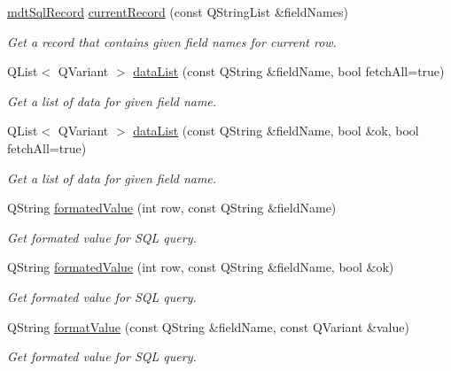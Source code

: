 \begin{DoxyCompactItemize}
\hyperlink{classmdt_sql_record}{mdt\-Sql\-Record} \hyperlink{classmdt_abstract_sql_table_controller_a0f397fe1d28fe99360a31479c023629f}{current\-Record} (const Q\-String\-List \&field\-Names)
\begin{DoxyCompactList}\small\item\em Get a record that contains given field names for current row. \end{DoxyCompactList}\item 
Q\-List$<$ Q\-Variant $>$ \hyperlink{classmdt_abstract_sql_table_controller_a46896c6920f306f2c2ad03281ec64c74}{data\-List} (const Q\-String \&field\-Name, bool fetch\-All=true)
\begin{DoxyCompactList}\small\item\em Get a list of data for given field name. \end{DoxyCompactList}\item 
Q\-List$<$ Q\-Variant $>$ \hyperlink{classmdt_abstract_sql_table_controller_a712e896a677fc0f6660305c35947ef9f}{data\-List} (const Q\-String \&field\-Name, bool \&ok, bool fetch\-All=true)
\begin{DoxyCompactList}\small\item\em Get a list of data for given field name. \end{DoxyCompactList}\item 
Q\-String \hyperlink{classmdt_abstract_sql_table_controller_ae904bcb5f6656e6f88a3c3c73191e337}{formated\-Value} (int row, const Q\-String \&field\-Name)
\begin{DoxyCompactList}\small\item\em Get formated value for S\-Q\-L query. \end{DoxyCompactList}\item 
Q\-String \hyperlink{classmdt_abstract_sql_table_controller_a359d809042ec35007a58dacb6a1172ea}{formated\-Value} (int row, const Q\-String \&field\-Name, bool \&ok)
\begin{DoxyCompactList}\small\item\em Get formated value for S\-Q\-L query. \end{DoxyCompactList}\item 
Q\-String \hyperlink{classmdt_abstract_sql_table_controller_a17b43facd84cd020c498ac3367b49595}{format\-Value} (const Q\-String \&field\-Name, const Q\-Variant \&value)
\begin{DoxyCompactList}\small\item\em Get formated value for S\-Q\-L query. \end{DoxyCompactList}\item 

\end{DoxyCompactItemize}
